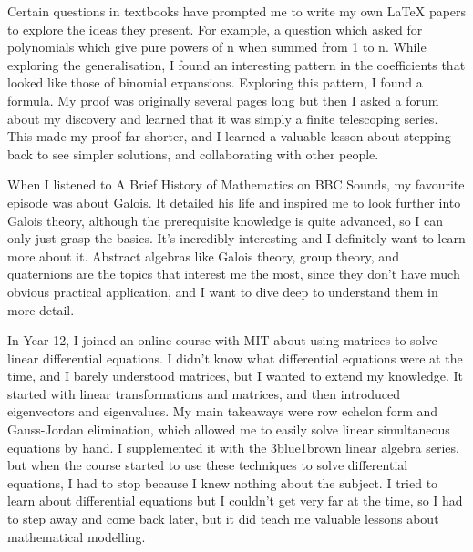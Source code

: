 \documentclass[a4paper, 12pt]{article}
\newenvironment{personalstatement}{\directlua{startPersonalStatement()}}{\directlua{stopPersonalStatement()}}
\begin{document}
\begin{personalstatement}
Certain questions in textbooks have prompted me to write my own LaTeX papers to explore the ideas they present. For example, a question which asked for polynomials which give pure powers of n when summed from 1 to n. While exploring the generalisation, I found an interesting pattern in the coefficients that looked like those of binomial expansions. Exploring this pattern, I found a formula. My proof was originally several pages long but then I asked a forum about my discovery and learned that it was simply a finite telescoping series. This made my proof far shorter, and I learned a valuable lesson about stepping back to see simpler solutions, and collaborating with other people.

When I listened to A Brief History of Mathematics on BBC Sounds, my favourite episode was about Galois. It detailed his life and inspired me to look further into Galois theory, although the prerequisite knowledge is quite advanced, so I can only just grasp the basics. It's incredibly interesting and I definitely want to learn more about it. Abstract algebras like Galois theory, group theory, and quaternions are the topics that interest me the most, since they don't have much obvious practical application, and I want to dive deep to understand them in more detail.

In Year 12, I joined an online course with MIT about using matrices to solve linear differential equations. I didn't know what differential equations were at the time, and I barely understood matrices, but I wanted to extend my knowledge. It started with linear transformations and matrices, and then introduced eigenvectors and eigenvalues. My main takeaways were row echelon form and Gauss-Jordan elimination, which allowed me to easily solve linear simultaneous equations by hand. I supplemented it with the 3blue1brown linear algebra series, but when the course started to use these techniques to solve differential equations, I had to stop because I knew nothing about the subject. I tried to learn about differential equations but I couldn't get very far at the time, so I had to step away and come back later, but it did teach me valuable lessons about mathematical modelling.
\end{personalstatement}

\end{document}
